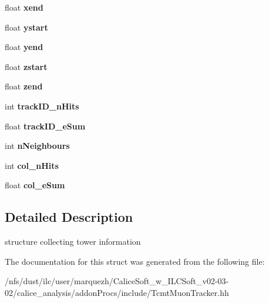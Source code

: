 \begin{DoxyCompactItemize}
\item 
float {\bfseries xend}\label{structCALICE_1_1TcmtMuonTracker_1_1tcmtTower_a40c1091d45eda4386e4c9057ae154db7}

\item 
float {\bfseries ystart}\label{structCALICE_1_1TcmtMuonTracker_1_1tcmtTower_a9cd6f3e15e8cd21480a218bb35d3dc89}

\item 
float {\bfseries yend}\label{structCALICE_1_1TcmtMuonTracker_1_1tcmtTower_aa60be9a496a38bd17d276e2c174bc7dc}

\item 
float {\bfseries zstart}\label{structCALICE_1_1TcmtMuonTracker_1_1tcmtTower_a3372a0ec966a91ec67b00063c7bdfb33}

\item 
float {\bfseries zend}\label{structCALICE_1_1TcmtMuonTracker_1_1tcmtTower_afaa0810a3d827db4ec6253f37f4c851e}

\item 
int {\bfseries track\-I\-D\-\_\-n\-Hits}\label{structCALICE_1_1TcmtMuonTracker_1_1tcmtTower_ab6c9361c2d0f1f787a149e6291455dbd}

\item 
float {\bfseries track\-I\-D\-\_\-e\-Sum}\label{structCALICE_1_1TcmtMuonTracker_1_1tcmtTower_ab32287988385bb47951c75dadddadd0a}

\item 
int {\bfseries n\-Neighbours}\label{structCALICE_1_1TcmtMuonTracker_1_1tcmtTower_a77047b480e6ed855d633bde5fda4df27}

\item 
int {\bfseries col\-\_\-n\-Hits}\label{structCALICE_1_1TcmtMuonTracker_1_1tcmtTower_a52fa47d9d817a05ee1464f9766261aec}

\item 
float {\bfseries col\-\_\-e\-Sum}\label{structCALICE_1_1TcmtMuonTracker_1_1tcmtTower_ad79c9a17809bdd59bb2adb1a3ce54944}

\end{DoxyCompactItemize}


\subsection{Detailed Description}
structure collecting tower information 

The documentation for this struct was generated from the following file\-:\begin{DoxyCompactItemize}
\item 
/nfs/dust/ilc/user/marquezh/\-Calice\-Soft\-\_\-w\-\_\-\-I\-L\-C\-Soft\-\_\-v02-\/03-\/02/calice\-\_\-analysis/addon\-Procs/include/Tcmt\-Muon\-Tracker.\-hh\end{DoxyCompactItemize}
